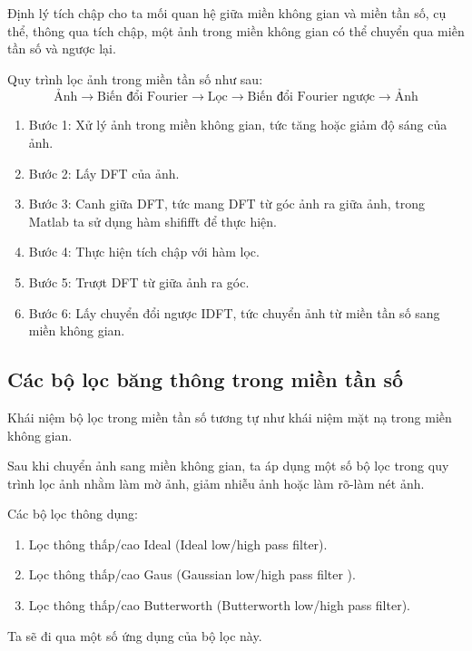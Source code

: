\documentclass[12pt,a4paper]{report}
\numberwithin{equation}{section}
\theoremstyle{definition} %
\begin{document}
Định lý tích chập cho ta mối quan hệ giữa miền không gian và miền tần số, cụ thể, thông qua tích chập, một ảnh trong miền không gian có thể chuyển qua miền tần số và ngược lại.

Quy trình lọc ảnh trong miền tần số như sau:
\[\text{Ảnh}\rightarrow\text{Biến đổi Fourier}\rightarrow\text{Lọc}\rightarrow\text{Biến đổi Fourier ngược}
\rightarrow\text{Ảnh}\]
\begin{enumerate}
\item Bước 1: Xử lý ảnh trong miền không gian, tức tăng hoặc giảm độ sáng của ảnh.
\item Bước 2: Lấy DFT của ảnh.
\item Bước 3: Canh giữa DFT, tức mang DFT từ góc ảnh ra giữa ảnh, trong Matlab ta sử dụng hàm shififft để thực hiện.
\item Bước 4: Thực hiện tích chập với hàm lọc.
\item Bước 5: Trượt DFT từ giữa ảnh ra góc.
\item Bước 6: Lấy chuyển đổi ngược IDFT, tức chuyển ảnh từ miền tần số sang miền không gian.
\end{enumerate}
\subsection{Các bộ lọc băng thông trong miền tần số}

Khái niệm bộ lọc trong miền tần số tương tự như khái niệm mặt nạ trong miền không gian.

Sau khi chuyển ảnh sang miền không gian, ta áp dụng một số bộ lọc trong quy trình lọc ảnh nhằm làm mờ ảnh, giảm nhiễu ảnh hoặc làm rõ-làm nét ảnh.

Các bộ lọc thông dụng:
\begin{enumerate}
\item Lọc thông thấp/cao Ideal (Ideal low/high pass filter).
\item Lọc thông thấp/cao Gaus (Gaussian low/high pass filter
).
\item Lọc thông thấp/cao Butterworth (Butterworth low/high pass filter).
\end{enumerate}

Ta sẽ đi qua một số ứng dụng của bộ lọc này.




\end{document}
